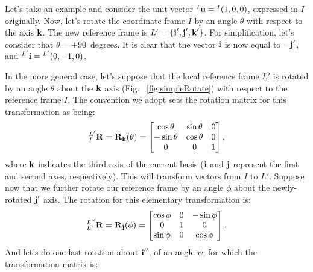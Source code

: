 
Let's take an example and consider the unit vector ${}_{}^{I}\textrm{\textbf{u}} = {}_{}^{I}(1, 0, 0)$, expressed in $I$ originally. Now, let's rotate the coordinate frame $I$ by an angle $\theta$ with respect to the axis $\textrm{\textbf{k}}$. The new reference frame is $L' = \{\textrm{\textbf{i}}',\textrm{\textbf{j}}',\textrm{\textbf{k}}'\}$. For simplification, let's consider that $\theta = +90$~degrees. It is clear that the vector $\textrm{\textbf{i}}$ is now equal to $-\textrm{\textbf{j}}'$, and ${}_{}^{L'}\textrm{\textbf{i}} = {}_{}^{L'}(0,-1,0)$. 



In the more general case, let's suppose that the local reference frame $L'$ is rotated by an angle $\theta$ about the $\textrm{\textbf{k}}$ axis (Fig.~ \ref{fig:simpleRotate}) with respect to the reference frame $I$. The convention we adopt sets the rotation matrix for this transformation as being:
\begin{equation}
{}_{I}^{L'}\textrm{\textbf{R}} = \textrm{\textbf{R}}_{\textrm{\textbf{k}}}(\theta) = 
\begin{bmatrix} \cos\theta & \sin\theta & 0 \\
				-\sin\theta & \cos\theta & 0 \\
                0 & 0 & 1
\end{bmatrix},
\end{equation}
where $\textrm{\textbf{k}}$ indicates the third axis of the current basis ($\textrm{\textbf{i}}$ and $\textrm{\textbf{j}}$ represent the first and second axes, respectively). This will transform vectors from $I$ to $L'$. Suppose now that we further rotate our reference frame by an angle $\phi$ about the newly-rotated $\textrm{\textbf{j}}'$ axis. The rotation for this elementary transformation is:
\begin{equation}
{}_{L'}^{L''}\textrm{\textbf{R}} = \textrm{\textbf{R}}_{\textrm{\textbf{j}}}(\phi) = 
\begin{bmatrix} \cos\phi  & 0 & -\sin\phi\\
                0  & 1 & 0 \\
				\sin\phi  & 0 & \cos\phi
\end{bmatrix}.
\end{equation}
And let's do one last rotation about $\textrm{\textbf{i}}''$, of an angle $\psi$, for which the transformation matrix is:


